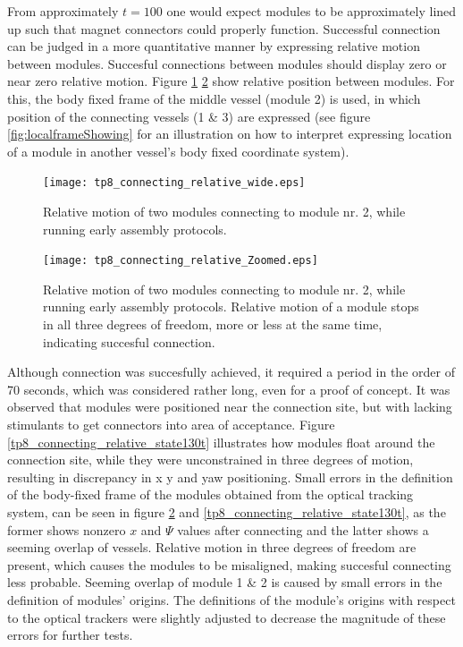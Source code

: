 From approximately $t=100$ one would expect modules to be approximately lined up such that magnet connectors could properly function. Successful connection can be judged in a more quantitative manner by expressing relative motion between modules. Succesful connections between modules should display zero or near zero relative motion. Figure \ref{tp8_connecting_relative_wide} \ref{AsseblyFailedRelative} show relative position between modules. For this, the body fixed frame of the middle vessel (module 2) is used, in which position of the connecting vessels (1 \& 3) are expressed (see figure \ref{fig:localframeShowing} for an illustration on how to interpret expressing location of a module in another vessel's body fixed coordinate system). 

\begin{figure}[H]
	\centering
	\texttt{[image: tp8\_connecting\_relative\_wide.eps]}
	\caption{Relative motion of two modules connecting to module nr. 2, while running early assembly protocols.}
	\label{tp8_connecting_relative_wide}
\end{figure}

\begin{figure}[H]
	\centering
	\texttt{[image: tp8\_connecting\_relative\_Zoomed.eps]}
	\caption{Relative motion of two modules connecting to module nr. 2, while running early assembly protocols. Relative motion of a module stops in all three degrees of freedom, more or less at the same time, indicating succesful connection.}
	\label{AsseblyFailedRelative}
\end{figure}

Although connection was succesfully achieved, it required a period in the order of 70 seconds, which was considered rather long, even for a proof of concept. It was observed that modules were positioned near the connection site, but with lacking stimulants to get connectors into area of acceptance. Figure \ref{tp8_connecting_relative_state130t} illustrates how modules float around the connection site, while they were unconstrained in three degrees of motion, resulting in discrepancy in x y and yaw positioning.  Small errors in the definition of the body-fixed frame of the modules obtained from the optical tracking system, can be seen in figure \ref{AsseblyFailedRelative} and \ref{tp8_connecting_relative_state130t}, as the former shows nonzero $x$ and $\Psi$ values after connecting and the latter shows a seeming overlap of vessels. Relative motion in three degrees of freedom are present, which causes the modules to be misaligned, making succesful connecting less probable. Seeming overlap of module 1 \& 2 is caused by small errors in the definition of modules' origins. The definitions of the module's origins with respect to the optical trackers were slightly adjusted to decrease the magnitude of these errors for further tests. 

